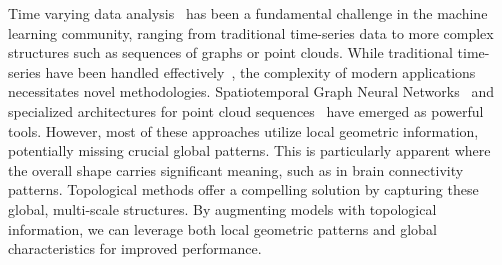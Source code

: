 \documentclass{article}
\theoremstyle{plain}
\theoremstyle{definition}
\theoremstyle{remark}
\begin{document}


Time varying data analysis~\cite{tsa,tsa2} has been a fundamental challenge in the machine learning community, ranging from traditional time-series data to more complex structures such as sequences of graphs or point clouds. While traditional time-series have been handled effectively~\cite{mvtsgnn}, the complexity of modern applications necessitates novel methodologies. Spatiotemporal Graph Neural Networks~\cite{stgcn,oreshkin2021,kan2022,chu2023} and specialized architectures for point cloud sequences~\cite{pcseq,fan2021pstnet,huang2021spatio,rempe2020caspr} have emerged as powerful tools. However, most of these approaches utilize local geometric information, potentially missing crucial global patterns. This is particularly apparent where the overall shape carries significant meaning, such as in brain connectivity patterns. Topological methods offer a compelling solution by capturing these global, multi-scale structures. By augmenting models with topological information, we can leverage both local geometric patterns and global characteristics for improved performance.
\end{document}
